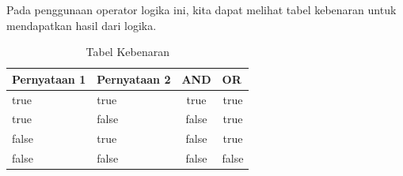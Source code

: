 \begin{enumerate}
\begin{itemize}
    \end{itemize}
    Pada penggunaan operator logika ini, kita dapat melihat tabel kebenaran untuk mendapatkan hasil dari logika.
    \begin{table}[h!]
        \centering
        \begin{tabular}{|l|l|c|c|}
            \hline
            \rowcolor[HTML]{9AFF99} 
            \textbf{Pernyataan 1}        & \textbf{Pernyataan 2}        & \multicolumn{1}{l|}{\cellcolor[HTML]{9AFF99}\textbf{AND}} & \multicolumn{1}{l|}{\cellcolor[HTML]{9AFF99}\textbf{OR}} \\ \hline
            {\color[HTML]{3166FF} true}  & {\color[HTML]{3166FF} true}  & {\color[HTML]{3166FF} true}                               & {\color[HTML]{3166FF} true}                              \\ \hline
            {\color[HTML]{3166FF} true}  & {\color[HTML]{FE0000} false} & {\color[HTML]{FE0000} false}                              & {\color[HTML]{3166FF} true}                              \\ \hline
            {\color[HTML]{FE0000} false} & {\color[HTML]{3166FF} true}  & {\color[HTML]{FE0000} false}                              & {\color[HTML]{3166FF} true}                              \\ \hline
            {\color[HTML]{FE0000} false} & {\color[HTML]{FE0000} false} & {\color[HTML]{FE0000} false}                              & {\color[HTML]{FE0000} false}                             \\ \hline
            \end{tabular}
        \caption{Tabel Kebenaran}
        \end{table}



\end{enumerate}
